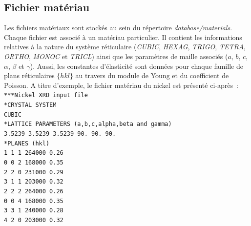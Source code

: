 \documentclass[french,a4paper]{report}
\begin{document}
\label{sec_fichierdetecteur}

\subsection{Fichier matériau}

Les fichiers matériaux sont stockés au sein du répertoire \textit{database/materials}. Chaque fichier est associé à un matériau particulier. Il contient les informations relatives à la nature du système réticulaire (\textit{CUBIC}, \textit{HEXAG}, \textit{TRIGO}, \textit{TETRA}, \textit{ORTHO}, \textit{MONOC} et \textit{TRICL}) ainsi que les paramètres de maille associés ($a$, $b$, $c$, $\alpha$, $\beta$ et $\gamma$). Aussi, les constantes d'élasticité sont données pour chaque famille de plans réticulaires $\{ hkl \}$ au travers du module de Young et du coefficient de Poisson. A titre d'exemple, le fichier matériau du nickel est présenté ci-après~:\\
\texttt{***Nickel XRD input file} \\
\texttt{*CRYSTAL SYSTEM} \\
\texttt{CUBIC} \\
\texttt{*LATTICE PARAMETERS (a,b,c,alpha,beta and gamma)} \\
\texttt{3.5239   3.5239   3.5239   90.   90.   90.} \\
\texttt{*PLANES (hkl)} \\
\texttt{1  1  1     264000   0.26} \\
\texttt{0  0  2     168000   0.35} \\
\texttt{2  2  0     231000   0.29} \\
\texttt{3  1  1     203000   0.32} \\
\texttt{2  2  2     264000   0.26} \\
\texttt{0  0  4     168000   0.35} \\
\texttt{3  3  1     240000   0.28} \\
\texttt{4  2  0     203000   0.32} \\
\label{sec_fichiermateriau}

% 
% 



\end{document}
